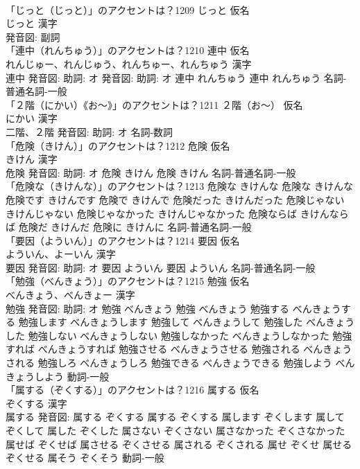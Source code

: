 \documentclass[8pt]{extreport}
\begin{document}
\begin{CJK}{UTF8}{min}
\\	「じっと（じっと）」のアクセントは？1209	じっと 仮名　
\\	じっと 漢字　
\\	発音図:							副詞 
\\	「連中（れんちゅう）」のアクセントは？1210	連中 仮名　
\\	れんじゅー、れんじゅう、れんちゅー、れんちゅう 漢字　
\\	連中 発音図: 助詞: オ 発音図: 助詞: オ	連中 れんちゅう		連中 れんちゅう				名詞-普通名詞-一般 
\\	「２階（にかい）《お〜》」のアクセントは？1211	２階（お〜） 仮名　
\\	にかい 漢字　
\\	二階、２階 発音図: 助詞: オ							名詞-数詞 
\\	「危険（きけん）」のアクセントは？1212	危険 仮名　
\\	きけん 漢字　
\\	危険 発音図: 助詞: オ	危険 きけん		危険 きけん				名詞-普通名詞-一般 
\\	「危険な（きけんな）」のアクセントは？1213		危険な きけんな		危険な きけんな 危険です きけんです 危険で きけんで 危険だった きけんだった 危険じゃない きけんじゃない 危険じゃなかった きけんじゃなかった 危険ならば きけんならば 危険だ きけんだ 危険に きけんに				名詞-普通名詞-一般 
\\	「要因（よういん）」のアクセントは？1214	要因 仮名　
\\	よういん、よーいん 漢字　
\\	要因 発音図: 助詞: オ	要因 よういん		要因 よういん				名詞-普通名詞-一般 
\\	「勉強（べんきょう）」のアクセントは？1215	勉強 仮名　
\\	べんきょう、べんきょー 漢字　
\\	勉強 発音図: 助詞: オ	勉強 べんきょう		勉強 べんきょう 勉強する べんきょうする 勉強します べんきょうします 勉強して べんきょうして 勉強した べんきょうした 勉強しない べんきょうしない 勉強しなかった べんきょうしなかった 勉強すれば べんきょうすれば 勉強させる べんきょうさせる 勉強される べんきょうされる 勉強しろ べんきょうしろ 勉強できる べんきょうできる 勉強しよう べんきょうしよう				動詞-一般 
\\	「属する（ぞくする）」のアクセントは？1216	属する 仮名　
\\	ぞくする 漢字　
\\	属する 発音図:	属する ぞくする		属する ぞくする 属します ぞくします 属して ぞくして 属した ぞくした 属さない ぞくさない 属さなかった ぞくさなかった 属せば ぞくせば 属させる ぞくさせる 属される ぞくされる 属せ ぞくせ 属せる ぞくせる 属そう ぞくそう				動詞-一般 

\end{CJK}
\end{document}
